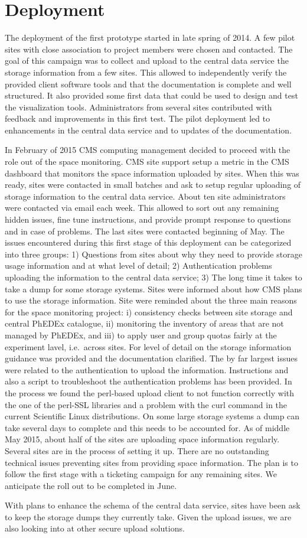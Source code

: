 \section{Deployment}

The deployment of the first prototype started in late spring of 2014.
A few pilot sites with close association to project members were
chosen and contacted. The goal of this campaign was to collect and
upload to the central data service the storage information from a few
sites. This allowed to independently verify the provided client
software tools and that the documentation is complete and well
structured. It also provided some first data that could be used to
design and test the visualization tools. Administrators from several
sites contributed with feedback and improvements in this first test.
The pilot deployment led to enhancements in the central data service
and to updates of the documentation.

In February of 2015 CMS computing management decided to proceed with
the role out of the space monitoring. CMS site support setup a metric
in the CMS dashboard that monitors the space information uploaded by
sites. When this was ready, sites were contacted in small batches and
ask to setup regular uploading of storage information to the central
data service. About ten site administrators were contacted via email
each week. This allowed to sort out any remaining hidden issues, fine
tune instructions, and provide prompt response to questions and in
case of problems. The last sites were contacted beginning of May. The
issues encountered during this first stage of this deployment can be
categorized into three groups: 1) Questions from sites about why they
need to provide storage usage information and at what level of detail;
2) Authentication problems uploading the information to the central
data service; 3) The long time it takes to take a dump for some
storage systems. Sites were informed about how CMS plans to use the
storage information. Site were reminded about the three main reasons
for the space monitoring project: i) consistency checks between site
storage and central PhEDEx catalogue, ii) monitoring the inventory of
areas that are not managed by PhEDEx, and iii) to apply user and group
quotas fairly at the experiment lavel, i.e.\ across sites. For level
of detail on the storage information guidance was provided and the
documentation clarified. The by far largest issues were related to
the authentication to upload the information. Instructions and also a
script to troubleshoot the authentication problems has been provided.
In the process we found the perl-based upload client to not function
correctly with the one of the perl-SSL libraries and a problem with
the curl command in the current Scientific Linux distributions. On
some large storage systems a dump can take several days to complete
and this needs to be accounted for. As of middle May 2015, about half
of the sites are uploading space information regularly. Several sites
are in the process of setting it up. There are no outstanding
technical issues preventing sites from providing space information.
The plan is to follow the first stage with a ticketing campaign for
any remaining sites. We anticipate the roll out to be completed in
June.

With plans to enhance the schema of the central data service, sites
have been ask to keep the storage dumps they currently take. Given
the upload issues, we are also looking into at other secure upload
solutions.
